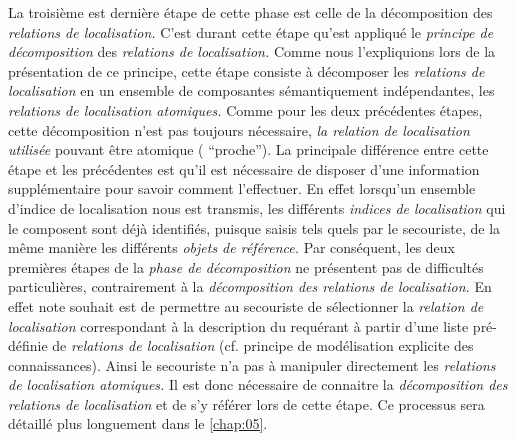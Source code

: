 La troisième est dernière étape de cette phase est celle de la
décomposition des \emph{relations de localisation.} C'est durant cette
étape qu'est appliqué le \emph{principe de décomposition} des
\emph{relations de localisation.} Comme nous l'expliquions lors de la
présentation de ce principe, cette étape consiste à décomposer les
\emph{relations de localisation} en un ensemble de composantes
sémantiquement indépendantes, les \emph{relations de localisation
  atomiques.} Comme pour les deux précédentes étapes, cette
décomposition n'est pas toujours nécessaire, \emph{la relation de
  localisation utilisée} pouvant être atomique (\eg
\enquote{proche}). La principale différence entre cette étape et les
précédentes est qu'il est nécessaire de disposer d'une information
supplémentaire pour savoir comment l'effectuer. En effet lorsqu'un
ensemble d'indice de localisation nous est transmis, les différents
\emph{indices de localisation} qui le composent sont déjà identifiés,
puisque saisis tels quels par le secouriste, de la même manière les
différents \emph{objets de référence.} Par conséquent, les deux
premières étapes de la \emph{phase de décomposition} ne présentent pas
de difficultés particulières, contrairement à la \emph{décomposition
  des relations de localisation.} En effet note souhait est de
permettre au secouriste de sélectionner la \emph{relation de
  localisation} correspondant à la description du requérant à partir
d'une liste pré-définie de \emph{relations de localisation}
(cf. principe de modélisation explicite des connaissances). Ainsi le
secouriste n'a pas à manipuler directement les \emph{relations de
  localisation atomiques.} Il est donc nécessaire de connaitre la
\emph{décomposition des relations de localisation} et de s'y référer
lors de cette étape. Ce processus sera détaillé plus longuement dans
le \autoref{chap:05}.


